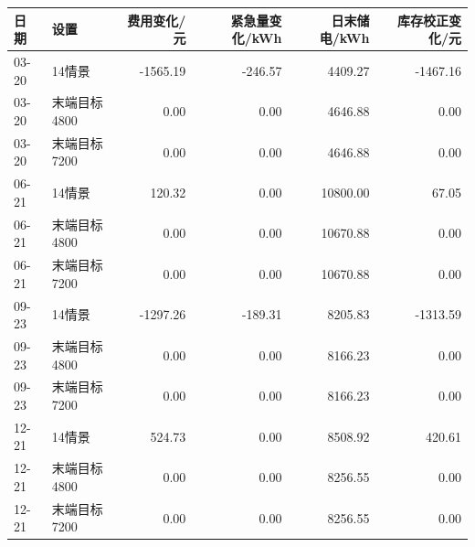 \begin{tabular}{llrrrr}
\toprule
日期 & 设置 & 费用变化/元 & 紧急量变化/kWh & 日末储电/kWh & 库存校正变化/元 \\
\midrule
03-20 & 14情景 & -1565.19 & -246.57 & 4409.27 & -1467.16 \\
03-20 & 末端目标4800 & 0.00 & 0.00 & 4646.88 & 0.00 \\
03-20 & 末端目标7200 & 0.00 & 0.00 & 4646.88 & 0.00 \\
06-21 & 14情景 & 120.32 & 0.00 & 10800.00 & 67.05 \\
06-21 & 末端目标4800 & 0.00 & 0.00 & 10670.88 & 0.00 \\
06-21 & 末端目标7200 & 0.00 & 0.00 & 10670.88 & 0.00 \\
09-23 & 14情景 & -1297.26 & -189.31 & 8205.83 & -1313.59 \\
09-23 & 末端目标4800 & 0.00 & 0.00 & 8166.23 & 0.00 \\
09-23 & 末端目标7200 & 0.00 & 0.00 & 8166.23 & 0.00 \\
12-21 & 14情景 & 524.73 & 0.00 & 8508.92 & 420.61 \\
12-21 & 末端目标4800 & 0.00 & 0.00 & 8256.55 & 0.00 \\
12-21 & 末端目标7200 & 0.00 & 0.00 & 8256.55 & 0.00 \\
\bottomrule
\end{tabular}